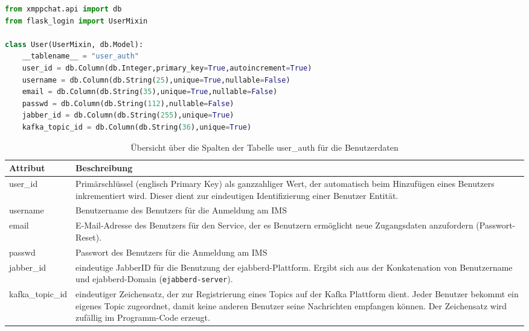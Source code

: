 \documentclass[a4paper,titlepage,halfparskip,12pt]{scrreprt}
\begin{document}
\begin{lstlisting}[language=python, caption={SQLAlchemy Schema für die Tabelle der Benutzerdaten}, label={lst:classUser}]
from xmppchat.api import db
from flask_login import UserMixin

class User(UserMixin, db.Model):
    __tablename__ = "user_auth"
    user_id = db.Column(db.Integer,primary_key=True,autoincrement=True)
    username = db.Column(db.String(25),unique=True,nullable=False)
    email = db.Column(db.String(35),unique=True,nullable=False)
    passwd = db.Column(db.String(112),nullable=False)
    jabber_id = db.Column(db.String(255),unique=True)
    kafka_topic_id = db.Column(db.String(36),unique=True)

\end{lstlisting}


\begin{table}[h]
\centering
\caption{Übersicht über die Spalten der Tabelle user\_auth für die Benutzerdaten}
\begin{tabular}{|l|p{}|}
\hline
\textbf{Attribut} & \textbf{Beschreibung} \\
\hline
user\_id & Primärschlüssel (englisch Primary Key) als ganzzahliger Wert, der automatisch beim Hinzufügen eines Benutzers inkrementiert wird. Dieser dient zur eindeutigen Identifizierung einer Benutzer Entität.\\
\hline
username & Benutzername des Benutzers für die Anmeldung am \acs{IMS}\\
\hline
email & E-Mail-Adresse des Benutzers für den Service, der es Benutzern ermöglicht neue Zugangsdaten anzufordern (Passwort-Reset).\\
\hline
passwd & Passwort des Benutzers für die Anmeldung am \acs{IMS}\\
\hline
jabber\_id & eindeutige JabberID für die Benutzung der ejabberd-Plattform. Ergibt sich aus der Konkatenation von Benutzername und ejabberd-Domain (\texttt{ejabberd-server}).\\
\hline
kafka\_topic\_id & eindeutiger Zeichensatz, der zur Registrierung eines Topics auf der Kafka Plattform dient. Jeder Benutzer bekommt ein eigenes Topic zugeordnet, damit keine anderen Benutzer seine Nachrichten empfangen können. Der Zeichensatz wird zufällig im Programm-Code erzeugt.\\
\hline
\end{tabular}
\label{tab:descriptionUserClass}
\end{table}

\pagebreak
\end{document}

